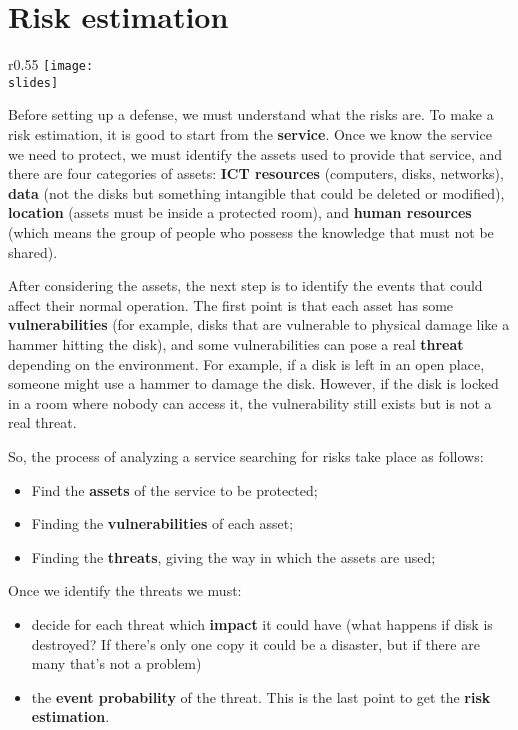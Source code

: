 \section{Risk estimation}

\begin{wrapfigure}{r}{0.55\textwidth}
  \centering
  \texttt{[image: \\slides]}
\end{wrapfigure}

Before setting up a defense, we must understand what the risks are. To make a risk estimation, it is good to start from the \textbf{service}. Once we know the service we need to protect, we must identify the assets used to provide that service, and there are four categories of assets: \textbf{ICT resources} (computers, disks, networks), \textbf{data} (not the disks but something intangible that could be deleted or modified), \textbf{location} (assets must be inside a protected room), and \textbf{human resources} (which means the group of people who possess the knowledge that must not be shared).

After considering the assets, the next step is to identify the events that could affect their normal operation. The first point is that each asset has some \textbf{vulnerabilities} (for example, disks that are vulnerable to physical damage like a hammer hitting the disk), and some vulnerabilities can pose a real \textbf{threat} depending on the environment. For example, if a disk is left in an open place, someone might use a hammer to damage the disk. However, if the disk is locked in a room where nobody can access it, the vulnerability still exists but is not a real threat.

\vspace{5mm}
So, the process of analyzing a service searching for risks take place as follows:
\begin{itemize}
  \item Find the \textbf{assets} of the service to be protected;
  \item Finding the \textbf{vulnerabilities} of each asset;
  \item Finding the \textbf{threats}, giving the way in which the assets are used;
\end{itemize}

\vspace{5mm}
Once we identify the threats we must:
\begin{itemize}
  \item decide for each threat which \textbf{impact} it could have (what happens if disk is destroyed? If there's only one copy it could be a disaster, but if there are many that's not a problem)
  \item the \textbf{event probability} of the threat. This is the last point to get the \textbf{risk estimation}.
\end{itemize}

